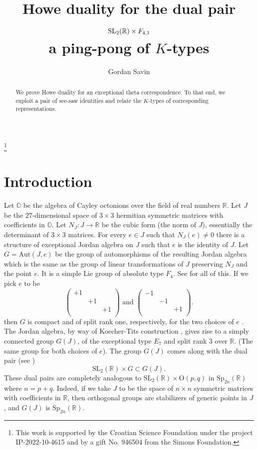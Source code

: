\documentclass[11pt]{amsart}
\title {Howe duality for the dual pair $\SL_2(\mathbb R) \times F_{4,1}$ \\ a ping-pong of $K$-types}
\author{Gordan Savin}
\theoremstyle{plain}
\numberwithin{equation}{section}
\newcommand{\Aut}{{\mathrm{Aut}}}
\newcommand{\rO}{{\mathrm{O}}}
\newcommand{\Sp}{{\mathrm{Sp}}}
\newcommand{\SL}{{\mathrm{SL}}}
\begin{document}
\begin{abstract} 
We prove Howe duality for an exceptional theta correspondence. To that end, 
 we exploit a pair of see-saw identities and relate the $K$-types of corresponding representations.  
\end{abstract} 


\footnote {This work is  supported by the Croatian Science Foundation under the project IP-2022-10-4615 and by a gift No. 946504 from the Simons Foundation.}

\maketitle 



\section{Introduction} 


\vskip 5pt 
Let $\mathbb O$ be the algebra of Cayley octonions over the field of real numbers $\mathbb R$. 
 Let $J$ be the $27$-dimensional space of $3\times 3$ hermitian symmetric matrices with coefficients in $\mathbb O$.  
 Let $N_J : J \rightarrow \mathbb R$ be the cubic form (the norm of $J$), essentially the determinant of $3\times 3$ matrices. 
For every $e\in J$ such that $N_J(e)\neq 0$ there is a structure of exceptional Jordan algebra on $J$ such that $e$ is the identity of $J$. 
Let $G=\Aut(J,e)$ be the group of automorphisms of the resulting Jordan algebra which is the same as the group of linear transformations of $J$ preserving 
$N_J$ and the point $e$.  It is a simple Lie  group of absolute type $F_4$. See \cite{KMRT} for all of this. 
If we pick $e$ to be 
\[ 
\left(\begin{array}{ccc} 
+1 & & \\
 & +1 &  \\
 & & +1 \\
\end{array} 
\right)
\text{ and } 
\left(\begin{array}{ccc} 
-1 & & \\
 & -1 &  \\
 & & +1 \\
\end{array} 
\right). 
\] 
then $G$ is compact and of split rank one, respectively,  for the two choices of $e$ \cite{OV}.   
The Jordan algebra, by way of Koecher-Tits construction \cite{K67}, gives rise to a simply connected group $G(J)$, of the exceptional type $E_7$ and split rank 3 over $\mathbb R$. 
(The same group for both choices of $e$).  The group $G(J)$ comes along with the dual pair (see \cite{KS15}) 
\[ 
\SL_2(\mathbb R) \times G \subset G(J). 
\] 
These dual pairs are completely analogous to $\SL_2(\mathbb R) \times \rO(p,q)$ in $\Sp_{2n}(\mathbb R)$ where $n=p+q$.  Indeed, if we take $J$ to be 
the space of $n\times n$ symmetric matrices with coefficients in $\mathbb R$, then orthogonal groups are stabilizers of generic points in $J$, and 
 $G(J)$ is $\Sp_{2n}(\mathbb R)$.  
\end{document}

